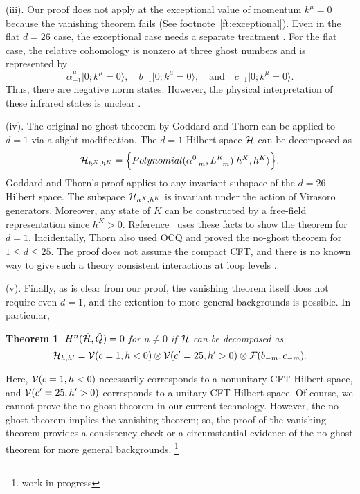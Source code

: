 \documentclass[a4paper,12pt]{article}
\newcommand{\ket}[1]{\mbox{$| #1 \rangle$}}
\newcommand{\hQ}{\hat{Q}}
\newtheorem{theorem}{Theorem}[section]
\begin{document}
(iii). Our proof does not apply at the exceptional value
of momentum $k^{\mu}=0$ because the vanishing theorem fails (See footnote~\ref{ft:exceptional}). Even in the
flat $d=26$ case, the exceptional case needs a separate treatment
\cite{henneaux,FGZ,BMP}. 
For the flat case, the relative cohomology is nonzero at three ghost numbers and is represented by
\begin{equation}
%
\alpha^{\mu}_{-1} \ket{0;k^{\mu}=0},
\quad
b_{-1} \ket{0;k^{\mu}=0},
\quad \mbox{and} \quad
c_{-1} \ket{0;k^{\mu}=0}.
%
\end{equation}
Thus, there are negative norm states. However, the physical interpretation of these infrared states is unclear \cite{henneaux,Witten:1992yj}.

(iv). The original no-ghost theorem by Goddard and Thorn \cite{ocq2} can be applied to $d=1$ via a slight modification. The $d=1$ Hilbert space $ {\cal H} $ can be decomposed as
\begin{equation}
%
{\cal H}_{h^X,h^K} = 
\Bigl\{ Polynomial(\alpha^{0}_{-m}, L_{-m}^{K}) \ket{h^X, h^K} \Bigr\}.
%
\end{equation}
Goddard and Thorn's proof applies to any invariant subspace of the $d=26$ Hilbert space. The subspace ${\cal H}_{h^X,h^K}$ is invariant under the action of Virasoro generators. Moreover, any state of $K$ can be constructed by a free-field representation since $h^K>0$. Reference~\cite{GM} uses these facts to show the theorem for $d=1$. Incidentally, Thorn \cite{thorn1} also used OCQ and proved the no-ghost theorem for $1 \leq d \leq 25$. The proof does not assume the compact CFT, and there is no known way to give such a theory consistent interactions at loop levels \cite{Mandelstam:1974fq}.

(v). Finally, as is clear from our proof, the vanishing theorem itself does not  require even $d=1$, and the extention to more general backgrounds is possible. In particular, 
\begin{theorem}%
%
$H^n(\hat{\cal H}, \hQ)=0$ for $n\neq 0$ if $ {\cal H} $ can be decomposed as
\begin{equation}
%
{\cal H}_{h,h'} = {\cal V}(c=1, h<0) \otimes {\cal V}(c'=25, h'>0) \otimes {\cal F}(b_{-m}, c_{-m}).
%
\end{equation}
%
\end{theorem}
\noindent Here, ${\cal V}(c=1, h<0)$ necessarily corresponds to a nonunitary CFT Hilbert space, and ${\cal V}(c'=25, h'>0)$ corresponds to a unitary CFT Hilbert space. Of course, we cannot prove the no-ghost theorem in our current technology. However, the no-ghost theorem implies the vanishing theorem; so, the proof of the vanishing theorem provides a consistency check or a circumstantial evidence of the no-ghost theorem for more general backgrounds.%
\footnote{work in progress}
\end{document}
